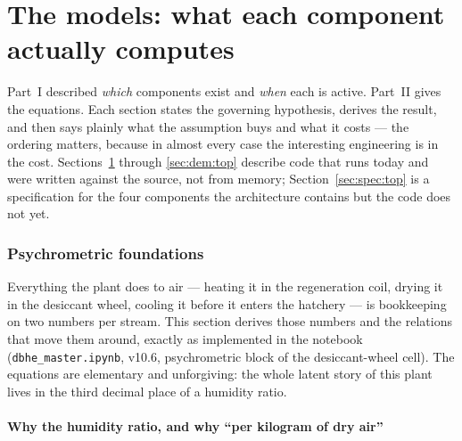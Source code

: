 \documentclass[11pt]{article}
\begin{document}
\part{The models: what each component actually computes}

Part~I described \emph{which} components exist and \emph{when} each is active.
Part~II gives the equations. Each section states the governing hypothesis,
derives the result, and then says plainly what the assumption buys and what it
costs --- the ordering matters, because in almost every case the interesting
engineering is in the cost. Sections~\ref{sec:psy:top} through
\ref{sec:dem:top} describe code that runs today and were written against the
source, not from memory; Section~\ref{sec:spec:top} is a specification for the
four components the architecture contains but the code does not yet.

\section{Psychrometric foundations}\label{sec:psy:top}
\label{sec:psy:foundations}

Everything the plant does to air --- heating it in the regeneration coil, drying it in the desiccant
wheel, cooling it before it enters the hatchery --- is bookkeeping on two numbers per stream. This
section derives those numbers and the relations that move them around, exactly as implemented in the
notebook (\texttt{dbhe\_master.ipynb}, v10.6, psychrometric block of the desiccant-wheel cell). The
equations are elementary and unforgiving: the whole latent story of this plant lives in the third
decimal place of a humidity ratio.

\subsection{Why the humidity ratio, and why ``per kilogram of dry air''}
\label{sec:psy:why-w}
\end{document}
